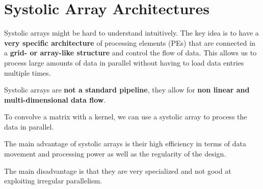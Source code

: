 \section{Systolic Array Architectures}

\begin{remark}
    Systolic arrays might be hard to understand intuitively. The key idea is to have a \textbf{very specific architecture} of processing elements (PEs) that are connected in a \textbf{grid- or array-like structure} and control the flow of data. This allows us to process large amounts of data in parallel without having to load data entries multiple times.
\end{remark}

\begin{important}
    Systolic arrays are \textbf{not a standard pipeline}, they allow for \textbf{non linear and multi-dimensional data flow}.
\end{important}

\begin{example}
    To convolve a matrix with a kernel, we can use a systolic array to process the data in parallel. 
\end{example}

\begin{remark}
    The main advantage of systolic arrays is their high efficiency in terms of data movement and processing power as well as the regularity of the design. 
\end{remark}

\begin{remark}
    The main disadvantage is that they are very specialized and not good at exploiting irregular parallelism.
\end{remark}
